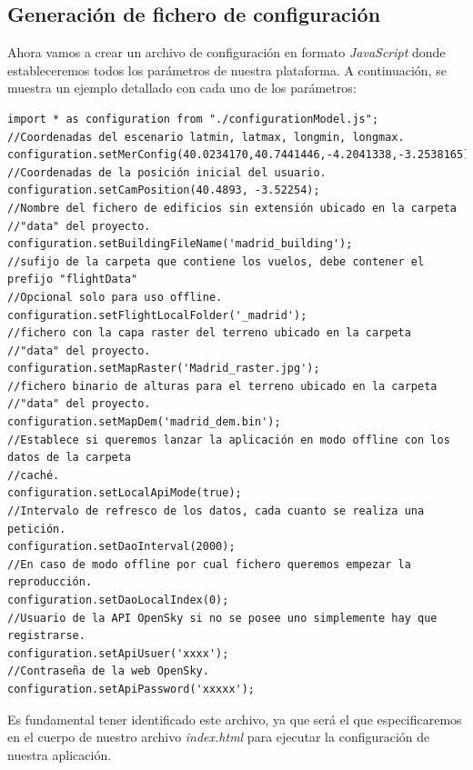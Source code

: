 \documentclass[a4paper, 11pt]{book}
\begin{document}
\subsection{Generación de fichero de configuración}
\label{conf:ficheroConfig}
Ahora vamos a crear un archivo de configuración en formato \emph{JavaScript} donde estableceremos todos los parámetros de nuestra plataforma. 
A continuación, se muestra un ejemplo detallado con cada uno de los parámetros:
\begin{verbatim}
import * as configuration from "./configurationModel.js";
//Coordenadas del escenario latmin, latmax, longmin, longmax.
configuration.setMerConfig(40.0234170,40.7441446,-4.2041338,-3.2538165);
//Coordenadas de la posición inicial del usuario.
configuration.setCamPosition(40.4893, -3.52254);
//Nombre del fichero de edificios sin extensión ubicado en la carpeta 
//"data" del proyecto.
configuration.setBuildingFileName('madrid_building');
//sufijo de la carpeta que contiene los vuelos, debe contener el prefijo "flightData"
//Opcional solo para uso offline.
configuration.setFlightLocalFolder('_madrid');
//fichero con la capa raster del terreno ubicado en la carpeta 
//"data" del proyecto.
configuration.setMapRaster('Madrid_raster.jpg');
//fichero binario de alturas para el terreno ubicado en la carpeta 
//"data" del proyecto.
configuration.setMapDem('madrid_dem.bin');
//Establece si queremos lanzar la aplicación en modo offline con los datos de la carpeta
//caché.
configuration.setLocalApiMode(true);
//Intervalo de refresco de los datos, cada cuanto se realiza una petición.
configuration.setDaoInterval(2000);
//En caso de modo offline por cual fichero queremos empezar la reproducción.
configuration.setDaoLocalIndex(0);
//Usuario de la API OpenSky si no se posee uno simplemente hay que registrarse.
configuration.setApiUsuer('xxxx');
//Contraseña de la web OpenSky.
configuration.setApiPassword('xxxxx');
\end{verbatim}
Es fundamental tener identificado este archivo, ya que será el que especificaremos en el cuerpo de nuestro archivo \emph{index.html} para ejecutar la configuración de nuestra aplicación.
\end{document}
